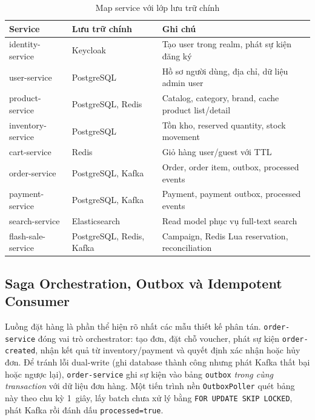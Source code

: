 \documentclass[../DoAn.tex]{subfiles}
\begin{document}
\begin{table}[H]
\centering
\caption{Map service với lớp lưu trữ chính}
\label{table:service-storage-map}
\begin{compacttable}
\begin{tabularx}{\textwidth}{|L{3.1cm}|L{3cm}|Y|}
\hline
\textbf{Service} & \textbf{Lưu trữ chính} & \textbf{Ghi chú} \\ \hline
identity-service & Keycloak & Tạo user trong realm, phát sự kiện đăng ký \\ \hline
user-service & PostgreSQL & Hồ sơ người dùng, địa chỉ, dữ liệu admin user \\ \hline
product-service & PostgreSQL, Redis & Catalog, category, brand, cache product list/detail \\ \hline
inventory-service & PostgreSQL & Tồn kho, reserved quantity, stock movement \\ \hline
cart-service & Redis & Giỏ hàng user/guest với TTL \\ \hline
order-service & PostgreSQL, Kafka & Order, order item, outbox, processed events \\ \hline
payment-service & PostgreSQL, Kafka & Payment, payment outbox, processed events \\ \hline
search-service & Elasticsearch & Read model phục vụ full-text search \\ \hline
flash-sale-service & PostgreSQL, Redis, Kafka & Campaign, Redis Lua reservation, reconciliation \\ \hline
\end{tabularx}
\end{compacttable}
\end{table}

\subsection{Saga Orchestration, Outbox và Idempotent Consumer}

Luồng đặt hàng là phần thể hiện rõ nhất các mẫu thiết kế phân tán. \texttt{order-service} đóng
vai trò orchestrator: tạo đơn, đặt chỗ voucher, phát sự kiện \texttt{order-created}, nhận kết
quả từ inventory/payment và quyết định xác nhận hoặc hủy đơn. Để tránh lỗi dual-write (ghi
database thành công nhưng phát Kafka thất bại hoặc ngược lại), \texttt{order-service} ghi sự
kiện vào bảng \texttt{outbox} \textit{trong cùng transaction} với dữ liệu đơn hàng. Một tiến
trình nền \texttt{OutboxPoller} quét bảng này theo chu kỳ 1~giây, lấy batch chưa xử lý bằng
\texttt{FOR UPDATE SKIP LOCKED}, phát Kafka rồi đánh dấu \texttt{processed=true}.
\end{document}
